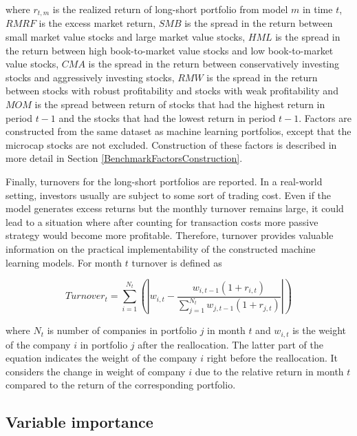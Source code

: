 \documentclass[12pt]{article}
\begin{document}
where $r_{t, m}$ is the realized return of long-short portfolio from model $m$ in time $t$, $RMRF$ is the excess market return, $SMB$ is the spread in the return between small market value stocks and large market value stocks, $HML$ is the spread in the return between high book-to-market value stocks and low book-to-market value stocks, $CMA$ is the spread in the return between conservatively investing stocks and aggressively investing stocks, $RMW$ is the spread in the return between stocks with robust profitability and stocks with weak profitability and $MOM$ is the spread between return of stocks that had the highest return in period $t-1$ and the stocks that had the lowest return in period $t-1$. \footnotemark {} Factors are constructed from the same dataset as machine learning portfolios, except that the microcap stocks are not excluded. Construction of these factors is described in more detail in Section \ref{BenchmarkFactorsConstruction}. \par

Finally, turnovers for the long-short portfolios are reported. In a real-world setting, investors usually are subject to some sort of trading cost. Even if the model generates excess returns but the monthly turnover remains large, it could lead to a situation where after counting for transaction costs more passive strategy would become more profitable. Therefore, turnover provides valuable information on the practical implementability of the constructed machine learning models. For month $t$ turnover is defined as \par

\begin{equation}
\label{eq:Turnover}
Turnover_t = \sum_{i=1}^{N_t}  \left ( \left | w_{i, t} - \frac{w_{i, t-1}(1 + r_{i, t})}{ \sum_{j=1}^{N_{t}} w_{j, t-1}(1 + r_{j, t})} \right | \right )
\end{equation}

where $N_t$ is number of companies in portfolio $j$ in month $t$ and $w_{i, t}$ is the weight of the company $i$ in portfolio $j$ after the reallocation. The latter part of the equation indicates the weight of the company $i$ right before the reallocation. It considers the change in weight of company $i$ due to the relative return in month $t$ compared to the return of the corresponding portfolio.

\subsection{Variable importance} \label{VariableImportance}
\end{document}
